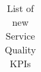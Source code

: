 \begin{landscape}
\begin{table}
\begin{tabular}{|l|l|l|l|}
\end{tabular}
\caption{List of new Service Quality KPIs}
\label{tab:servicequality}
\end{table}
\end{landscape}